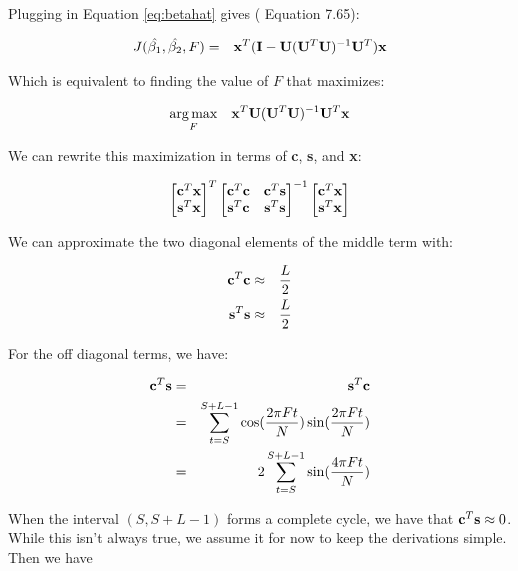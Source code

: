 \documentclass[11pt]{article}
\theoremstyle{plain}
\theoremstyle{definition}
\DeclareMathOperator*{\argmax}{arg\,max}
\begin{document}
\noindent Plugging in Equation \ref{eq:betahat} gives (\cite{kay1993fundamentals} Equation 7.65):

\begin{eqnarray}
	J(\hat{\beta_1}, \hat{\beta_2}, F) &=& {\bf x}^T ({\bf I} - {\bf U} ({\bf U}^T {\bf U})^{-1} {\bf U}^T) {\bf x}
\end{eqnarray}

\noindent Which is equivalent to finding the value of $F$ that maximizes:

\begin{eqnarray}
	\argmax_{F} && {\bf x}^{T} {\bf U} ({\bf U}^T {\bf U})^{-1} {\bf U}^T {\bf x}
\end{eqnarray}

\noindent We can rewrite this maximization in terms of {\bf c}, {\bf s}, and {\bf x}:

$$
\begin{bmatrix}
{\bf c}^T {\bf x} \\
{\bf s}^T {\bf x} 
\end{bmatrix}^T
\begin{bmatrix}
{\bf c}^T {\bf c} & {\bf c}^T {\bf s} \\ 
{\bf s}^T {\bf c} & {\bf s}^T {\bf s}
\end{bmatrix}^{-1}
\begin{bmatrix}
{\bf c}^T {\bf x} \\
{\bf s}^T {\bf x} 
\end{bmatrix}
$$

\noindent We can approximate the two diagonal elements of the middle term with:

\begin{eqnarray}
	{\bf c}^T {\bf c} &\approx& \frac{L}{2} \nonumber \\
	{\bf s}^T {\bf s} &\approx& \frac{L}{2} 
\end{eqnarray}

\noindent For the off diagonal terms, we have:

\begin{eqnarray}
	{\bf c}^T {\bf s} &=& {\bf s}^T {\bf c} \nonumber \\
	&=& \sum_{t=S}^{S+L-1} \cos(\frac{2 \pi F t}{N}) \sin(\frac{2 \pi F t}{N}) \nonumber \\
	&=& 2 \sum_{t=S}^{S+L-1} \sin(\frac{4 \pi F t}{N}) \nonumber \\
\end{eqnarray}

\noindent When the interval $(S, S+L-1)$ forms a complete cycle, we have that ${\bf c}^T {\bf s} \approx 0$. While this isn't always true, we assume it for now to keep the derivations simple. Then we have
\end{document}
